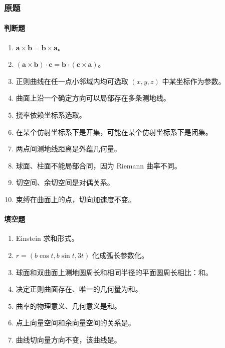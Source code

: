 \documentclass[UTF8,12pt,a4paper]{ctexart}
\newcommand{\vct}[1]{\boldsymbol{#1}}
\begin{document}
\subsubsection*{原题}
\paragraph{判断题}
\begin{enumerate}
\item $\vct a\times\vct b=\vct b\times\vct a$。
\item $(\vct a\times\vct b)\cdot\vct c=\vct b\cdot(\vct c\times\vct a)$。
\item 正则曲线在任一点小邻域内均可选取 $(x,y,z)$ 中某坐标作为参数。
\item 曲面上沿一个确定方向可以局部存在多条测地线。
\item 挠率依赖坐标系选取。
\item 在某个仿射坐标系下是开集，可能在某个仿射坐标系下是闭集。
\item 两点间测地线距离是外蕴几何量。
\item 球面、柱面不能局部合同，因为 Riemann 曲率不同。
\item 切空间、余切空间是对偶关系。
\item 束缚在曲面上的点，切向加速度不变。
\end{enumerate}
\paragraph{填空题}
\begin{enumerate}
\item Einstein 求和形式。
\item $r=(b\cos t,b\sin t,3t)$ 化成弧长参数化。
\item 球面和双曲面上测地圆周长和相同半径的平面圆周长相比：\underline{\hspace{2cm}}和\underline{\hspace{2cm}}。
\item 决定正则曲面存在、唯一的几何量为\underline{\hspace{2cm}}和\underline{\hspace{2cm}}。
\item 曲率的物理意义、几何意义是\underline{\hspace{3cm}}和\underline{\hspace{3cm}}。
\item 点上向量空间和余向量空间的关系是\underline{\hspace{3cm}}。
\item 曲线切向量方向不变，该曲线是\underline{\hspace{2cm}}。
\end{enumerate}
\end{document}
